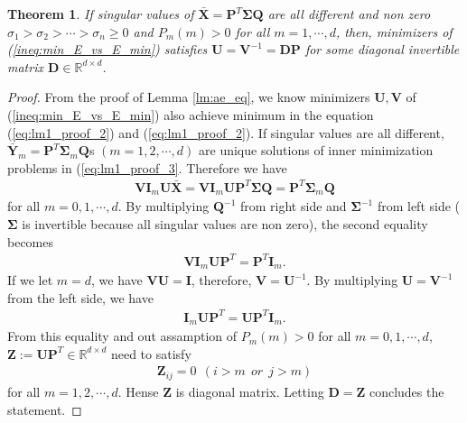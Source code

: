 \documentclass{article}
\newtheorem{theorem}{Theorem}
\begin{document}
    \begin{theorem}
      \label{th:svd}
      If singular values of $\bar{\mathbf{X}} = \mathbf{P}^T \mathbf{\Sigma} \mathbf{Q}$ are all different and non zero $\sigma_1 > \sigma_2 > \cdots > \sigma_n \geq 0$ and $P_m(m) > 0$ for all $m = 1, \cdots, d$, then, minimizers of (\ref{ineq:min_E_vs_E_min}) satisfies $\mathbf{U} = \mathbf{V}^{-1} = \mathbf{D} \mathbf{P}$ for some diagonal invertible matrix $\mathbf{D} \in \mathbb{R}^{d \times d}$.
    \end{theorem}
    \begin{proof}
    From the proof of Lemma \ref{lm:ae_eq}, we know minimizers $\mathbf{U}, \mathbf{V}$ of (\ref{ineq:min_E_vs_E_min}) also achieve minimum in the equation (\ref{eq:lm1_proof_2}) and  (\ref{eq:lm1_proof_2}). If singular values are all different, $\bar{\mathbf{Y}}_m = \mathbf{P}^T \mathbf{\Sigma}_m \mathbf{Q}$s $(m=1,2,\cdots,d)$ are unique solutions of inner minimization problems in (\ref{eq:lm1_proof_3}. Therefore we have
    \begin{align}
        \mathbf{V} \mathbf{I}_m \mathbf{U} \bar{\mathbf{X}}
        = \mathbf{V} \mathbf{I}_m \mathbf{U} \mathbf{P}^T \mathbf{\Sigma} \mathbf{Q}
        = \mathbf{P}^T \mathbf{\Sigma}_m \mathbf{Q} \nonumber
    \end{align}
    for all $m=0, 1, \cdots, d$.
    By multiplying $\mathbf{Q}^{-1}$ from right side and $\mathbf{\Sigma}^{-1}$ from left side ($\mathbf{\Sigma}$ is invertible because all singular values are non zero), the second equality becomes
    \begin{align}
        \mathbf{V} \mathbf{I}_m \mathbf{U} \mathbf{P}^T
        = \mathbf{P}^T \mathbf{I}_m.
    \end{align}
    If we let $m = d$, we have $\mathbf{V} \mathbf{U} = \mathbf{I}$, therefore, $\mathbf{V} = \mathbf{U}^{-1}$. 
    By multiplying $\mathbf{U} = \mathbf{V}^{-1}$ from the left side, we have
    \begin{align}
        \mathbf{I}_m \mathbf{U} \mathbf{P}^T
        = \mathbf{U} \mathbf{P}^T \mathbf{I}_m.
    \end{align}
    From this equality and out assamption of $P_m(m) >0$ for all $m=0, 1, \cdots, d$, $\mathbf{Z} := \mathbf{U} \mathbf{P}^T \in \mathbb{R}^{d \times d}$ need to satisfy
    \begin{align}
        \mathbf{Z}_{ij} = 0 \ \  (i > m \ \  or \ \ j > m)
    \end{align}
    for all $m = 1, 2, \cdots, d$. Hense $\mathbf{Z}$ is diagonal matrix. Letting $\mathbf{D} = \mathbf{Z}$ concludes the statement.
    \end{proof}
    
\end{document}
